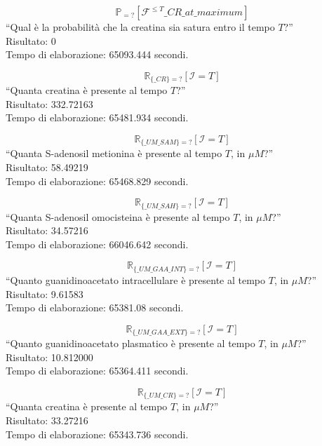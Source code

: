 \begin{equation}
	\mathbb{P}_{=?} [ \mathcal{F}^{\leq T} \_CR\_at\_maximum ]
\end{equation}
``Qual \`e la probabilit\`a che la creatina sia satura entro il tempo $T$?''\\
Risultato: 0\\
Tempo di elaborazione: 65093.444 secondi.

\begin{equation}
	\mathbb{R}_{\{\_CR\}=?} [ \mathcal{I}=T ]
\end{equation}
``Quanta creatina \`e presente al tempo $T$?''\\
Risultato: 332.72163\\
Tempo di elaborazione: 65481.934 secondi.

\begin{equation}
	\mathbb{R}_{\{\_UM\_SAM\}=?} [ \mathcal{I}=T ]
\end{equation}
``Quanta S-adenosil metionina \`e presente al tempo $T$, in $\mu M$?''\\
Risultato: 58.49219\\
Tempo di elaborazione: 65468.829 secondi.

\begin{equation}
	\mathbb{R}_{\{\_UM\_SAH\}=?} [ \mathcal{I}=T ]
\end{equation}
``Quanta S-adenosil omocisteina \`e presente al tempo $T$, in $\mu M$?''\\
Risultato: 34.57216\\
Tempo di elaborazione: 66046.642 secondi.

\begin{equation}
	\mathbb{R}_{\{\_UM\_GAA\_INT\}=?} [ \mathcal{I}=T ]
\end{equation}
``Quanto guanidinoacetato intracellulare \`e presente al tempo $T$, in $\mu M$?''\\
Risultato: 9.61583\\
Tempo di elaborazione: 65381.08 secondi.

\begin{equation}
	\mathbb{R}_{\{\_UM\_GAA\_EXT\}=?} [ \mathcal{I}=T ]
\end{equation}
``Quanto guanidinoacetato plasmatico \`e presente al tempo $T$, in $\mu M$?''\\
Risultato: 10.812000\\
Tempo di elaborazione: 65364.411 secondi.

\begin{equation}
	\mathbb{R}_{\{\_UM\_CR\}=?} [ \mathcal{I}=T ]
\end{equation}
``Quanta creatina \`e presente al tempo $T$, in $\mu M$?''\\
Risultato: 33.27216\\
Tempo di elaborazione: 65343.736 secondi.

